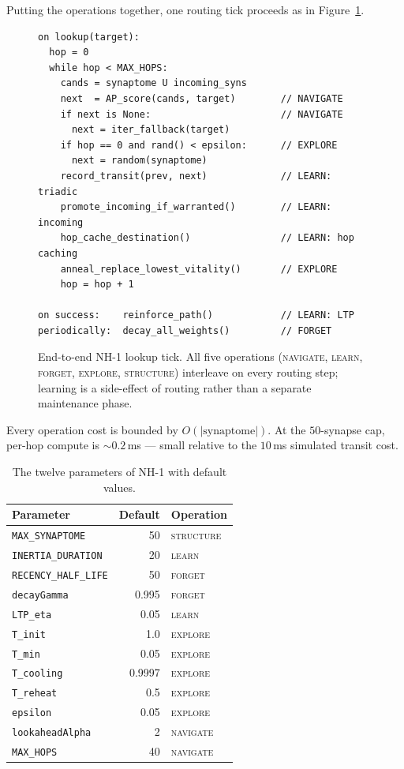 \documentclass[conference]{IEEEtran}
\newcommand{\nhone}{NH-1\xspace}
\begin{document}
Putting the operations together, one routing tick proceeds as in
Figure~\ref{fig:tick}.

\begin{figure}[t]
{\footnotesize
\begin{verbatim}
on lookup(target):
  hop = 0
  while hop < MAX_HOPS:
    cands = synaptome U incoming_syns
    next  = AP_score(cands, target)        // NAVIGATE
    if next is None:                       // NAVIGATE
      next = iter_fallback(target)
    if hop == 0 and rand() < epsilon:      // EXPLORE
      next = random(synaptome)
    record_transit(prev, next)             // LEARN: triadic
    promote_incoming_if_warranted()        // LEARN: incoming
    hop_cache_destination()                // LEARN: hop caching
    anneal_replace_lowest_vitality()       // EXPLORE
    hop = hop + 1

on success:    reinforce_path()            // LEARN: LTP
periodically:  decay_all_weights()         // FORGET
\end{verbatim}}
\caption{End-to-end NH-1 lookup tick. All five operations
(\textsc{navigate}, \textsc{learn}, \textsc{forget}, \textsc{explore},
\textsc{structure}) interleave on every routing step; learning is a
side-effect of routing rather than a separate maintenance phase.}
\label{fig:tick}
\end{figure}

Every operation cost is bounded by $O(|\mathrm{synaptome}|)$. At the
$50$-synapse cap, per-hop compute is $\sim\!0.2$\,ms --- small relative
to the $10$\,ms simulated transit cost.

\begin{table}[t]
\centering
\caption{The twelve parameters of \nhone with default values.}
\label{tab:params}
\small
\begin{tabular}{@{}lrl@{}}
\toprule
\textbf{Parameter} & \textbf{Default} & \textbf{Operation} \\
\midrule
\texttt{MAX\_SYNAPTOME} & 50 & \textsc{structure} \\
\texttt{INERTIA\_DURATION} & 20 & \textsc{learn} \\
\texttt{RECENCY\_HALF\_LIFE} & 50 & \textsc{forget} \\
\texttt{decayGamma} & 0.995 & \textsc{forget} \\
\texttt{LTP\_eta} & 0.05 & \textsc{learn} \\
\texttt{T\_init} & 1.0 & \textsc{explore} \\
\texttt{T\_min} & 0.05 & \textsc{explore} \\
\texttt{T\_cooling} & 0.9997 & \textsc{explore} \\
\texttt{T\_reheat} & 0.5 & \textsc{explore} \\
\texttt{epsilon} & 0.05 & \textsc{explore} \\
\texttt{lookaheadAlpha} & 2 & \textsc{navigate} \\
\texttt{MAX\_HOPS} & 40 & \textsc{navigate} \\
\bottomrule
\end{tabular}
\end{table}
\end{document}
